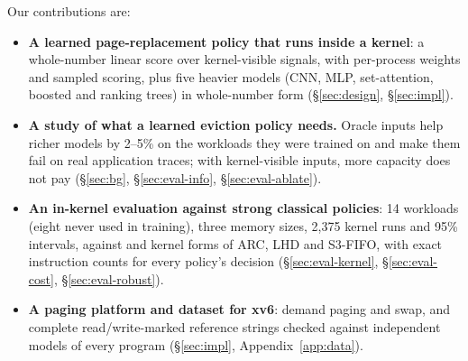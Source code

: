 
Our contributions are:
\begin{itemize}
\item \textbf{A learned page-replacement policy that runs inside a kernel}: a whole-number
  linear score over kernel-visible signals, with per-process weights and sampled
  scoring, plus five heavier models (CNN, MLP, set-attention, boosted and ranking trees)
  in whole-number form (\S\ref{sec:design}, \S\ref{sec:impl}).
\item \textbf{A study of what a learned eviction policy needs.} Oracle inputs help
  richer models by 2--5\% on the workloads they were trained on and make them fail on
  real application traces; with kernel-visible inputs, more capacity does not pay
  (\S\ref{sec:bg}, \S\ref{sec:eval-info}, \S\ref{sec:eval-ablate}).
\item \textbf{An in-kernel evaluation against strong classical policies}: 14 workloads
  (eight never used in training), three memory sizes, 2,375 kernel runs and 95\%
  intervals, against \clock and kernel forms of ARC, LHD and S3-FIFO, with exact
  instruction counts for every policy's decision (\S\ref{sec:eval-kernel},
  \S\ref{sec:eval-cost}, \S\ref{sec:eval-robust}).
\item \textbf{A paging platform and dataset for xv6}: demand paging and swap, and
  complete read/write-marked reference strings checked against independent models of
  every program (\S\ref{sec:impl}, Appendix~\ref{app:data}).
\end{itemize}

